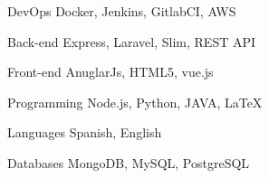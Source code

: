 

\begin{cvskills}

  \cvskill
    {DevOps} %
    {Docker, Jenkins, GitlabCI, AWS} %

  \cvskill
    {Back-end} %
    {Express, Laravel, Slim, REST API} %

  \cvskill
    {Front-end} %
    {AnuglarJs, HTML5, vue.js} %

  \cvskill
    {Programming} %
    {Node.js, Python, JAVA, \LaTeX } %

  \cvskill
    {Languages} %
    {Spanish, English} %

\cvskill
    {Databases} %
    {MongoDB, MySQL, PostgreSQL} %

\end{cvskills}
